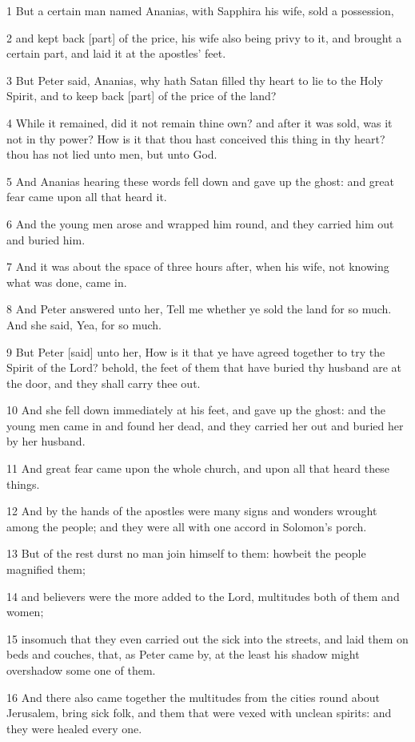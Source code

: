 \par 1 But a certain man named Ananias, with Sapphira his wife, sold a possession,
\par 2 and kept back [part] of the price, his wife also being privy to it, and brought a certain part, and laid it at the apostles' feet.
\par 3 But Peter said, Ananias, why hath Satan filled thy heart to lie to the Holy Spirit, and to keep back [part] of the price of the land?
\par 4 While it remained, did it not remain thine own? and after it was sold, was it not in thy power? How is it that thou hast conceived this thing in thy heart? thou has not lied unto men, but unto God.
\par 5 And Ananias hearing these words fell down and gave up the ghost: and great fear came upon all that heard it.
\par 6 And the young men arose and wrapped him round, and they carried him out and buried him.
\par 7 And it was about the space of three hours after, when his wife, not knowing what was done, came in.
\par 8 And Peter answered unto her, Tell me whether ye sold the land for so much. And she said, Yea, for so much.
\par 9 But Peter [said] unto her, How is it that ye have agreed together to try the Spirit of the Lord? behold, the feet of them that have buried thy husband are at the door, and they shall carry thee out.
\par 10 And she fell down immediately at his feet, and gave up the ghost: and the young men came in and found her dead, and they carried her out and buried her by her husband.
\par 11 And great fear came upon the whole church, and upon all that heard these things.
\par 12 And by the hands of the apostles were many signs and wonders wrought among the people; and they were all with one accord in Solomon's porch.
\par 13 But of the rest durst no man join himself to them: howbeit the people magnified them;
\par 14 and believers were the more added to the Lord, multitudes both of them and women;
\par 15 insomuch that they even carried out the sick into the streets, and laid them on beds and couches, that, as Peter came by, at the least his shadow might overshadow some one of them.
\par 16 And there also came together the multitudes from the cities round about Jerusalem, bring sick folk, and them that were vexed with unclean spirits: and they were healed every one.
